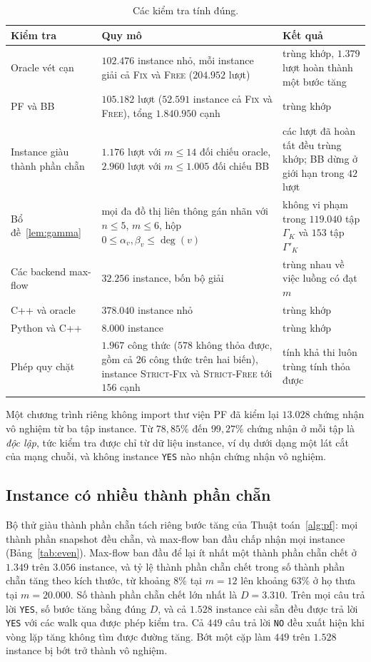 \documentclass[pdflatex,sn-mathphys-num]{sn-jnl}
\theoremstyle{thmstyleone}%
\theoremstyle{thmstyletwo}%
\theoremstyle{thmstylethree}%
\newcommand{\FIX}{\textup{\textsc{Fix}}}
\newcommand{\FREE}{\textup{\textsc{Free}}}
\newcommand{\SFIX}{\textup{\textsc{Strict-Fix}}}
\newcommand{\SFREE}{\textup{\textsc{Strict-Free}}}
\newcommand{\YES}{\texttt{YES}}
\newcommand{\NO}{\texttt{NO}}
\begin{document}
\begin{table}[t]
\caption{Các kiểm tra tính đúng.}
\label{tab:checks}
\begin{tabular*}{\textwidth}{@{\extracolsep\fill}p{}p{}p{}}
\toprule
Kiểm tra & Quy mô & Kết quả \\
\midrule
Oracle vét cạn & $102.476$ instance nhỏ, mỗi instance giải cả \FIX{} và \FREE{} ($204.952$ lượt) & trùng khớp, $1.379$ lượt hoàn thành một bước tăng \\
PF và BB & $105.182$ lượt ($52.591$ instance cả \FIX{} và \FREE{}), tổng $1.840.950$ cạnh & trùng khớp \\
Instance giàu thành phần chẵn & $1.176$ lượt với $m\le14$ đối chiếu oracle, $2.960$ lượt với $m\le1.005$ đối chiếu BB & các lượt đã hoàn tất đều trùng khớp; BB dừng ở giới hạn trong $42$ lượt \\
Bổ đề~\ref{lem:gamma} & mọi đa đồ thị liên thông gán nhãn với $n\le5$, $m\le6$, hộp $0\le\alpha_v,\beta_v\le\deg(v)$ & không vi phạm trong $119.040$ tập $\Gamma_K$ và $153$ tập $\Gamma'_K$ \\
Các backend max-flow & $32.256$ instance, bốn bộ giải & trùng nhau về việc luồng có đạt $m$ \\
C++ và oracle & $378.040$ instance nhỏ & trùng khớp \\
Python và C++ & $8.000$ instance & trùng khớp \\
Phép quy chặt & $1.967$ công thức ($578$ không thỏa được, gồm cả $26$ công thức trên hai biến), instance \SFIX{} và \SFREE{} tới $156$ cạnh & tính khả thi luôn trùng tính thỏa được \\
\bottomrule
\end{tabular*}
\end{table}

Một chương trình riêng không import thư viện PF đã kiểm lại $13.028$ chứng nhận vô nghiệm từ ba tập instance. Từ $78{,}85\%$ đến $99{,}27\%$ chứng nhận ở mỗi tập là \emph{độc lập}, tức kiểm tra được chỉ từ dữ liệu instance, ví dụ dưới dạng một lát cắt của mạng chuỗi, và không instance \YES{} nào nhận chứng nhận vô nghiệm.

\subsection{Instance có nhiều thành phần chẵn}\label{sec:exp-even}

Bộ thử giàu thành phần chẵn tách riêng bước tăng của Thuật toán~\ref{alg:pf}: mọi thành phần snapshot đều chẵn, và max-flow ban đầu chấp nhận mọi instance (Bảng~\ref{tab:even}). Max-flow ban đầu để lại ít nhất một thành phần chẵn chết ở $1.349$ trên $3.056$ instance, và tỷ lệ thành phần chẵn chết trong số thành phần chẵn tăng theo kích thước, từ khoảng $8\%$ tại $m=12$ lên khoảng $63\%$ ở họ thưa tại $m=20.000$. Số thành phần chẵn chết lớn nhất là $D=3.310$. Trên mọi câu trả lời \YES{}, số bước tăng bằng đúng $D$, và cả $1.528$ instance cài sẵn đều được trả lời \YES{} với các walk qua được phép kiểm tra. Cả $449$ câu trả lời \NO{} đều xuất hiện khi vòng lặp tăng không tìm được đường tăng. Bớt một cặp làm $449$ trên $1.528$ instance bị bớt trở thành vô nghiệm.
\end{document}
